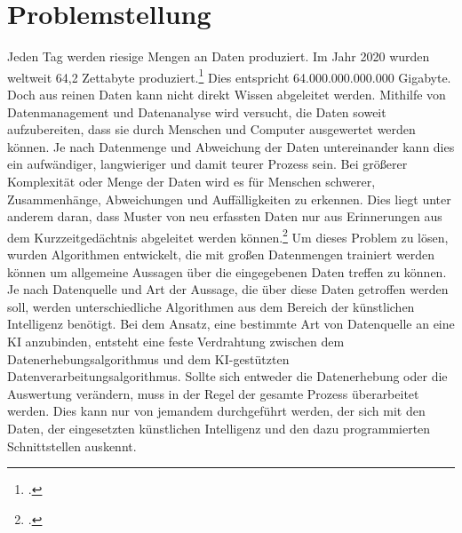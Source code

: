 \section{Problemstellung}
Jeden Tag werden riesige Mengen an Daten produziert. Im Jahr 2020 wurden weltweit 64,2 Zettabyte produziert.\footcite[Volumen der jährlich generierten digitalen Datenmenge]{Datenmenge} Dies entspricht 64.000.000.000.000 Gigabyte. Doch aus reinen Daten kann nicht direkt Wissen abgeleitet werden. Mithilfe von Datenmanagement und Datenanalyse wird versucht, die Daten soweit aufzubereiten, dass sie durch Menschen und Computer ausgewertet werden können. Je nach Datenmenge und Abweichung der Daten untereinander kann dies ein aufwändiger, langwieriger und damit teurer Prozess sein. Bei größerer Komplexität oder Menge der Daten wird es für Menschen schwerer, Zusammenhänge, Abweichungen und Auffälligkeiten zu erkennen. Dies liegt unter anderem daran, dass Muster von neu erfassten Daten nur aus Erinnerungen aus dem Kurzzeitgedächtnis abgeleitet werden können.\footcite[Music and memory: An introduction]{Memory} Um dieses Problem zu lösen, wurden Algorithmen entwickelt, die mit großen Datenmengen trainiert werden können um allgemeine Aussagen über die eingegebenen Daten treffen zu können. Je nach Datenquelle und Art der Aussage, die über diese Daten getroffen werden soll, werden unterschiedliche Algorithmen aus dem Bereich der künstlichen Intelligenz benötigt. Bei dem Ansatz, eine bestimmte Art von Datenquelle an eine KI anzubinden, entsteht eine feste Verdrahtung zwischen dem Datenerhebungsalgorithmus und dem KI-gestützten Datenverarbeitungsalgorithmus. Sollte sich entweder die Datenerhebung oder die Auswertung verändern, muss in der Regel der gesamte Prozess überarbeitet werden. Dies kann nur von jemandem durchgeführt werden, der sich mit den Daten, der eingesetzten künstlichen Intelligenz und den dazu programmierten Schnittstellen auskennt. 